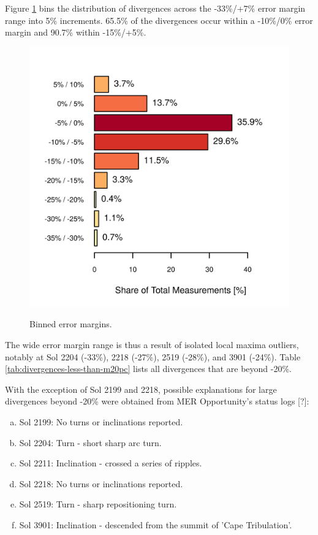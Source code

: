 \clearpage

Figure \ref{fig:plot:binned-error-margins} bins the distribution of divergences across the -33\%/+7\% error margin range into 5\% increments. 65.5\% of the divergences occur within a -10\%/0\% error margin and 90.7\%  within -15\%/+5\%.

\begin{figure}[h]
  \centering
  \hypersetup{linkcolor=captionTextColor}
  \includegraphics[width=0.5\linewidth]{sections/mars-solar-energy/photovoltaic-energy/plots/binned-error-margins.png}\\
  \caption[Binned error margins]
          {Binned error margins.}
  \label{fig:plot:binned-error-margins}
\end{figure}

The wide error margin range is thus a result of isolated local maxima outliers, notably at Sol 2204 (-33\%), 2218 (-27\%), 2519 (-28\%), and 3901 (-24\%). Table \ref{tab:divergences-less-than-m20pc} lists all divergences that are beyond -20\%.



With the exception of Sol 2199 and 2218, possible explanations for large divergences beyond -20\% were obtained from MER Opportunity's status logs [?]:
\begin{enumerate}[(a)]
  \item Sol 2199: No turns or inclinations reported.
  \item Sol 2204: Turn - short sharp arc turn.
  \item Sol 2211: Inclination - crossed a series of ripples.
  \item Sol 2218: No turns or inclinations reported.
  \item Sol 2519: Turn - sharp repositioning turn.
  \item Sol 3901: Inclination - descended from the summit of 'Cape Tribulation'.
\end{enumerate}

